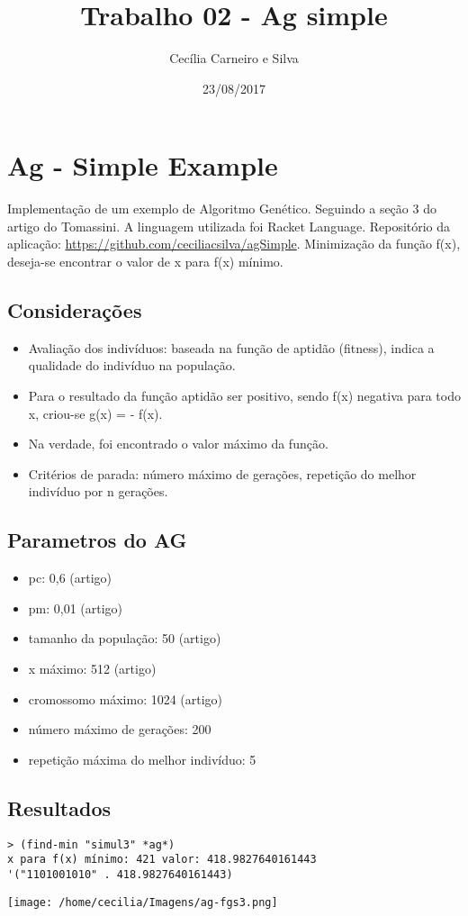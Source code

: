 \documentclass[11pt]{article}
\author{Cecília Carneiro e Silva}
\date{23/08/2017}
\title{Trabalho 02 - Ag simple}
\begin{document}
\maketitle

\section{Ag - Simple Example}
\label{sec-1}

Implementação de um exemplo de Algoritmo Genético. Seguindo a seção 3 do artigo do Tomassini. A linguagem utilizada foi Racket Language. Repositório da aplicação: \url{https://github.com/ceciliacsilva/agSimple}.
Minimização da função f(x), deseja-se encontrar o valor de x para f(x) mínimo.

\subsection{Considerações}
\label{sec-1-1}

\begin{itemize}
\item Avaliação dos indivíduos: baseada na função de aptidão (fitness), indica a qualidade do indivíduo na população.
\item Para o resultado da função aptidão ser positivo, sendo f(x) negativa para todo x, criou-se g(x) = - f(x).
\item Na verdade, foi encontrado o valor máximo da função.
\item Critérios de parada: número máximo de gerações, repetição do melhor indivíduo por n gerações.
\end{itemize}

\subsection{Parametros do AG}
\label{sec-1-2}

\begin{itemize}
\item pc: 0,6 (artigo)
\item pm: 0,01 (artigo)
\item tamanho da população: 50 (artigo)
\item x máximo: 512 (artigo)
\item cromossomo máximo: 1024 (artigo)
\item número máximo de gerações: 200
\item repetição máxima do melhor indivíduo: 5
\end{itemize}

\subsection{Resultados}
\label{sec-1-3}

\begin{verbatim}
> (find-min "simul3" *ag*)
x para f(x) mínimo: 421 valor: 418.9827640161443
'("1101001010" . 418.9827640161443)
\end{verbatim}

\texttt{[image: /home/cecilia/Imagens/ag-fgs3.png]}
\end{document}
